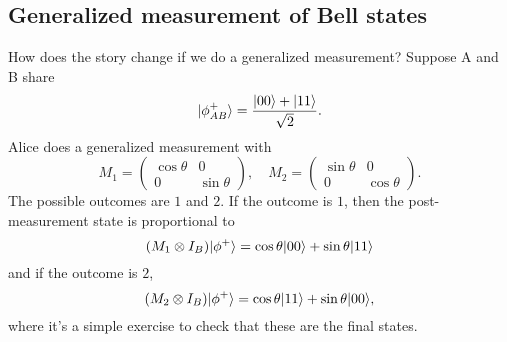 \subsection*{Generalized measurement of Bell states} How does the story change if we do a generalized measurement? Suppose A and B share
\begin{equation*}
    \lvert\phi^+_{AB}\rangle = \frac{\lvert00\rangle+ \lvert11\rangle}{\sqrt{2}}.
\end{equation*}
Alice does a generalized measurement with
\begin{equation}
    M_1 = \begin{pmatrix}\cos\theta & 0\\
    0&\sin\theta\end{pmatrix}, \quad M_2 = \begin{pmatrix}\sin\theta & 0\\
    0&\cos\theta\end{pmatrix}.
\end{equation}
The possible outcomes are $1$ and $2$. If the outcome is $1$, then the post-measurement state is proportional to
\begin{equation*}
    (M_1\otimes I_B) \lvert\phi^+\rangle=\cos\theta\lvert00\rangle + \sin\theta\lvert11\rangle
\end{equation*}
and if the outcome is $2$,
\begin{equation*}
    (M_2\otimes I_B) \lvert\phi^+\rangle=\cos\theta\lvert11\rangle + \sin\theta\lvert00\rangle,
\end{equation*}
where it's a simple exercise to check that these are the final states.

